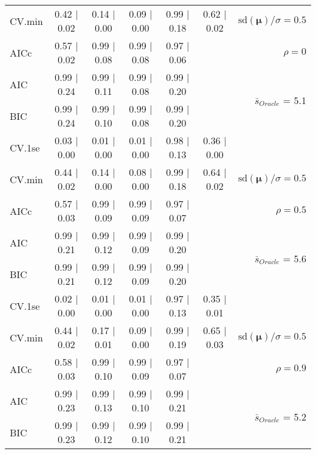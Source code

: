\begin{table}
\begin{center}
\begin{tabular}{l*{5}{c}|r}
CV.min & 0.42 $\mid$ 0.02 & 0.14 $\mid$ 0.00 & 0.09 $\mid$ 0.00 & 0.99 $\mid$ 0.18 & 0.62 $\mid$ 0.02 &  $\mathrm{sd}(\mathbf{\mu})/\sigma=0.5$ \\
AICc & 0.57 $\mid$ 0.02 & 0.99 $\mid$ 0.08 & 0.99 $\mid$ 0.08 & 0.97 $\mid$ 0.06 & & $\rho=0$ \\
AIC & 0.99 $\mid$ 0.24 & 0.99 $\mid$ 0.11 & 0.99 $\mid$ 0.08 & 0.99 $\mid$ 0.20 & &  \multirow{2}{*}{$\bar{s}_{Oracle}$ = 5.1} \\
BIC & 0.99 $\mid$ 0.24 & 0.99 $\mid$ 0.10 & 0.99 $\mid$ 0.08 & 0.99 $\mid$ 0.20 & &  \\
 \hline 
CV.1se & 0.03 $\mid$ 0.00 & 0.01 $\mid$ 0.00 & 0.01 $\mid$ 0.00 & 0.98 $\mid$ 0.13 & 0.36 $\mid$ 0.00 & \\
CV.min & 0.44 $\mid$ 0.02 & 0.14 $\mid$ 0.00 & 0.08 $\mid$ 0.00 & 0.99 $\mid$ 0.18 & 0.64 $\mid$ 0.02 &  $\mathrm{sd}(\mathbf{\mu})/\sigma=0.5$ \\
AICc & 0.57 $\mid$ 0.03 & 0.99 $\mid$ 0.09 & 0.99 $\mid$ 0.09 & 0.97 $\mid$ 0.07 & & $\rho=0.5$ \\
AIC & 0.99 $\mid$ 0.21 & 0.99 $\mid$ 0.12 & 0.99 $\mid$ 0.09 & 0.99 $\mid$ 0.20 & &  \multirow{2}{*}{$\bar{s}_{Oracle}$ = 5.6} \\
BIC & 0.99 $\mid$ 0.21 & 0.99 $\mid$ 0.12 & 0.99 $\mid$ 0.09 & 0.99 $\mid$ 0.20 & &  \\
 \hline 
CV.1se & 0.02 $\mid$ 0.00 & 0.01 $\mid$ 0.00 & 0.01 $\mid$ 0.00 & 0.97 $\mid$ 0.13 & 0.35 $\mid$ 0.01 & \\
CV.min & 0.44 $\mid$ 0.02 & 0.17 $\mid$ 0.01 & 0.09 $\mid$ 0.00 & 0.99 $\mid$ 0.19 & 0.65 $\mid$ 0.03 &  $\mathrm{sd}(\mathbf{\mu})/\sigma=0.5$ \\
AICc & 0.58 $\mid$ 0.03 & 0.99 $\mid$ 0.10 & 0.99 $\mid$ 0.09 & 0.97 $\mid$ 0.07 & & $\rho=0.9$ \\
AIC & 0.99 $\mid$ 0.23 & 0.99 $\mid$ 0.13 & 0.99 $\mid$ 0.10 & 0.99 $\mid$ 0.21 & &  \multirow{2}{*}{$\bar{s}_{Oracle}$ = 5.2} \\
BIC & 0.99 $\mid$ 0.23 & 0.99 $\mid$ 0.12 & 0.99 $\mid$ 0.10 & 0.99 $\mid$ 0.21 & &  \\
 \hline 
\end{tabular}
\end{center}
\vspace{-1cm}
\end{table}




